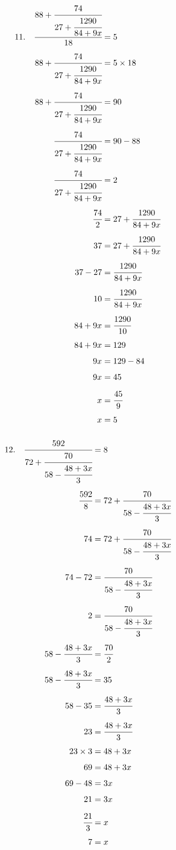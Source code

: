 \documentclass{article}
\begin{document}
\noindent
\begin{minipage}[t]{0.5000\textwidth}
\begin{align*}
11.\hspace{10pt}\cfrac{88+\cfrac{74}{27+\cfrac{1290}{84+9x}}}{18}&=5\\[4pt]
88+\cfrac{74}{27+\cfrac{1290}{84+9x}}&=5\times18\\[4pt]
88+\cfrac{74}{27+\cfrac{1290}{84+9x}}&=90\\[4pt]
\cfrac{74}{27+\cfrac{1290}{84+9x}}&=90-88\\[4pt]
\cfrac{74}{27+\cfrac{1290}{84+9x}}&=2\\[4pt]
\cfrac{74}{2}&=27+\cfrac{1290}{84+9x}\\[4pt]
37&=27+\cfrac{1290}{84+9x}\\[4pt]
37-27&=\cfrac{1290}{84+9x}\\[4pt]
10&=\cfrac{1290}{84+9x}\\[4pt]
84+9x&=\cfrac{1290}{10}\\[4pt]
84+9x&=129\\[4pt]
9x&=129-84\\[4pt]
9x&=45\\[4pt]
x&=\cfrac{45}{9}\\[4pt]
x&=5\\[4pt]
\end{align*}
\end{minipage}
\begin{minipage}[t]{0.5000\textwidth}
\begin{align*}
12.\hspace{10pt}\cfrac{592}{72+\cfrac{70}{58-\cfrac{48+3x}{3}}}&=8\\[4pt]
\cfrac{592}{8}&=72+\cfrac{70}{58-\cfrac{48+3x}{3}}\\[4pt]
74&=72+\cfrac{70}{58-\cfrac{48+3x}{3}}\\[4pt]
74-72&=\cfrac{70}{58-\cfrac{48+3x}{3}}\\[4pt]
2&=\cfrac{70}{58-\cfrac{48+3x}{3}}\\[4pt]
58-\cfrac{48+3x}{3}&=\cfrac{70}{2}\\[4pt]
58-\cfrac{48+3x}{3}&=35\\[4pt]
58-35&=\cfrac{48+3x}{3}\\[4pt]
23&=\cfrac{48+3x}{3}\\[4pt]
23\times3&=48+3x\\[4pt]
69&=48+3x\\[4pt]
69-48&=3x\\[4pt]
21&=3x\\[4pt]
\cfrac{21}{3}&=x\\[4pt]
7&=x\\[4pt]
\end{align*}
\end{minipage}
\vspace{10 mm}
\end{document}
